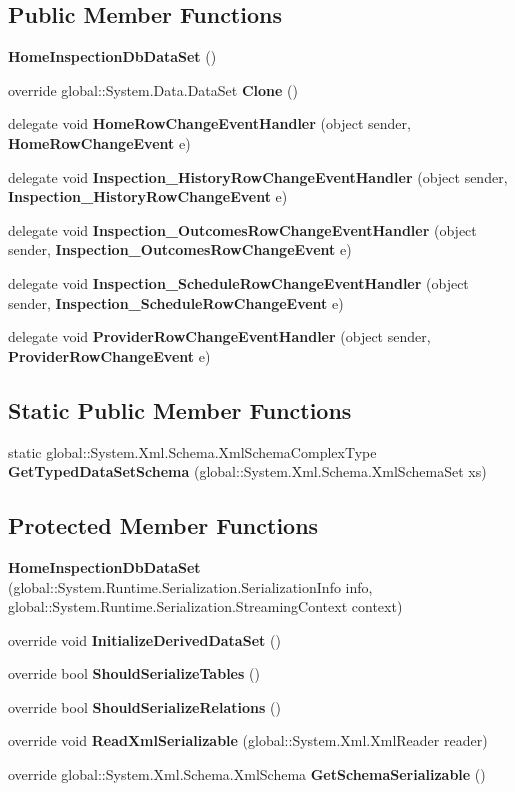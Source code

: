 \subsection*{Public Member Functions}
\begin{DoxyCompactItemize}
\item 
\textbf{ Home\+Inspection\+Db\+Data\+Set} ()
\item 
override global\+::\+System.\+Data.\+Data\+Set \textbf{ Clone} ()
\item 
delegate void \textbf{ Home\+Row\+Change\+Event\+Handler} (object sender, \textbf{ Home\+Row\+Change\+Event} e)
\item 
delegate void \textbf{ Inspection\+\_\+\+History\+Row\+Change\+Event\+Handler} (object sender, \textbf{ Inspection\+\_\+\+History\+Row\+Change\+Event} e)
\item 
delegate void \textbf{ Inspection\+\_\+\+Outcomes\+Row\+Change\+Event\+Handler} (object sender, \textbf{ Inspection\+\_\+\+Outcomes\+Row\+Change\+Event} e)
\item 
delegate void \textbf{ Inspection\+\_\+\+Schedule\+Row\+Change\+Event\+Handler} (object sender, \textbf{ Inspection\+\_\+\+Schedule\+Row\+Change\+Event} e)
\item 
delegate void \textbf{ Provider\+Row\+Change\+Event\+Handler} (object sender, \textbf{ Provider\+Row\+Change\+Event} e)
\end{DoxyCompactItemize}
\subsection*{Static Public Member Functions}
\begin{DoxyCompactItemize}
\item 
static global\+::\+System.\+Xml.\+Schema.\+Xml\+Schema\+Complex\+Type \textbf{ Get\+Typed\+Data\+Set\+Schema} (global\+::\+System.\+Xml.\+Schema.\+Xml\+Schema\+Set xs)
\end{DoxyCompactItemize}
\subsection*{Protected Member Functions}
\begin{DoxyCompactItemize}
\item 
\textbf{ Home\+Inspection\+Db\+Data\+Set} (global\+::\+System.\+Runtime.\+Serialization.\+Serialization\+Info info, global\+::\+System.\+Runtime.\+Serialization.\+Streaming\+Context context)
\item 
override void \textbf{ Initialize\+Derived\+Data\+Set} ()
\item 
override bool \textbf{ Should\+Serialize\+Tables} ()
\item 
override bool \textbf{ Should\+Serialize\+Relations} ()
\item 
override void \textbf{ Read\+Xml\+Serializable} (global\+::\+System.\+Xml.\+Xml\+Reader reader)
\item 
override global\+::\+System.\+Xml.\+Schema.\+Xml\+Schema \textbf{ Get\+Schema\+Serializable} ()
\end{DoxyCompactItemize}
